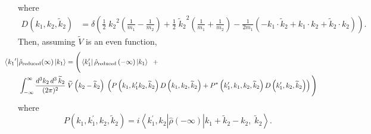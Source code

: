 \documentclass[11pt]{article}
\newcommand{\bra}[1]{\left\langle#1\right|}
\newcommand{\ket}[1]{\left|#1\right\rangle}
\newcommand{\op}[1]{\hat{#1}}
\theoremstyle{theorem}
\theoremstyle{remark}
\theoremstyle{step}
\theoremstyle{gap}
\begin{document}
where
\begin{align*}
D(k_1, k_2, \widetilde{k}_2) &= \delta\left({\textstyle \frac{1}{2}\;{{k}_2}^2\left(\frac{1}{m_1}-\frac{1}{m_2}\right)+ \frac{1}{2}\;{\widetilde{k}_2}^2\left(\frac{1}{m_1}+\frac{1}{m_2}\right) - \frac{1}{2m_1}\left(-k_1\cdot \widetilde{k}_2 + k_1 \cdot k_2 + \widetilde{k}_2 \cdot k_2\right)}\right).
\end{align*}
Then, assuming \(\widetilde{V}\) is an even function,
\begin{align}\label{eq.reddensevolution}
\hspace{-4em}\bra{{k_1}^\prime}&\op{\rho}_\text{reduced}(\infty)\ket{k_1}
= {\Bigg (}
\bra{k_1^\prime}\op{\rho}_\text{reduced}\left(-\infty\right)\ket{k_1}\;\;+
 \\&\nonumber \int_{-\infty}^\infty \frac{d^3k_2 \,d^3\,\widetilde{k}_2}{(2\pi)^2}\;\widetilde{V}\left(k_2 - 
\widetilde{k}_2\right)\;\left(P\left(k_1,k_1^\prime k_2, \widetilde{k}_2\right)D\left(k_1, k_2, \widetilde{k}_2\right) + P^*\left(k_1^\prime,k_1, k_2, \widetilde{k}_2\right)D\left(k_1^\prime, k_2, \widetilde{k}_2\right)\right){\Bigg )}
\end{align}
where
\[
P(k_1, k_1^\prime, k_2, \widetilde{k}_2) = i\bra{k_1^\prime, k_2} \op{\rho}\left(-\infty\right) \ket{k_1 + \widetilde{k}_2 - k_2,\; \widetilde{k}_2}.
\]
\end{document}
